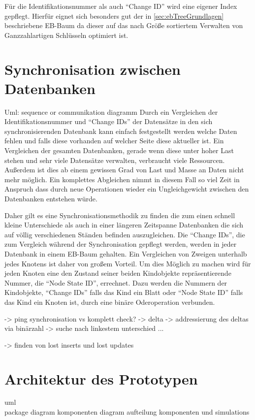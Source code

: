 \documentclass[a4paper,11pt,oneside,%
headsepline,												%
footsepline,												%
bibtotocnumbered									%
]{scrreprt}
\begin{document}
Für die Identifikationsnummer als auch \enquote{Change ID} wird eine eigener Index gepflegt. Hierfür eignet sich besonders gut der in \autoref{sec:ebTreeGrundlagen} beschriebene \ac{EB-Baum} da dieser auf das nach Größe sortiertem Verwalten von Ganzzahlartigen Schlüsseln optimiert ist. 







\section{Synchronisation zwischen Datenbanken}
\label{sec:eBTreeSynchronisation}
Uml: sequence or communikation diagramm
Durch ein Vergleichen der Identifikationsnummer und \enquote{Change IDs} der Datensätze in den sich synchronisierenden Datenbank kann einfach festgestellt werden welche Daten fehlen und falls diese vorhanden auf welcher Seite diese aktueller ist. Ein Vergleichen der gesamten Datenbanken, gerade wenn diese unter hoher Last stehen und sehr viele Datensätze verwalten, verbraucht viele Ressourcen. Außerdem ist dies ab einem gewissen Grad von Last und Masse an Daten nicht mehr möglich. Ein komplettes Abgleichen nimmt in diesem Fall so viel Zeit in Anspruch dass durch neue Operationen wieder ein Ungleichgewicht zwischen den Datenbanken entstehen würde.

Daher gilt es eine Synchronisationsmethodik zu finden die zum einen schnell kleine Unterschiede als auch in einer längeren Zeitspanne Datenbanken die sich auf völlig verschiedenen Ständen befinden auszugleichen.
Die \enquote{Change IDs}, die zum Vergleich während der Synchronisation gepflegt werden, werden in jeder Datenbank in einem \ac{EB-Baum} gehalten. Ein Vergleichen von Zweigen unterhalb jedes Knotens ist daher von großem Vorteil. Um dies Möglich zu machen wird für jeden Knoten eine den Zustand seiner beiden Kindobjekte repräsentierende Nummer, die \enquote{Node State ID}, errechnet. Dazu werden die Nummern der Kindobjekte, \enquote{Change IDs} falls das Kind ein Blatt oder \enquote{Node State ID} falls das Kind ein Knoten ist, durch eine binäre Oderoperation verbunden.
 

-> ping synchronisation vs komplett check?
-> delta
-> addressierung des deltas via binärzahl
-> suche nach linkestem unterschied ...

-> finden von lost inserts und lost updates		
	
\section{Architektur des Prototypen}
uml\\ package diagram komponenten diagram
aufteilung komponenten und simulations\\
\end{document}

